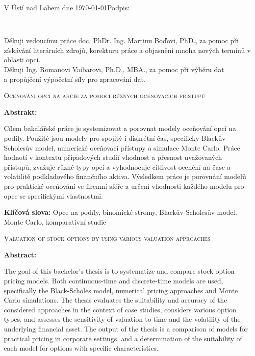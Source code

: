 \documentclass[male,czech,api_bc]{kitheses}
\newcommand{\nazevcz}{Oceňování opcí na akcie za pomocí různých oceňovacích přístupů}        %
\newcommand{\nazeven}{Valuation of stock options by using various valuation approaches}     %
\newcommand{\vedouciDAT}{doc. PhDr. Ing. Martinu Boďovi, PhD.}
\begin{document}
\vspace{2em}

V Ústí nad Labem dne \today   \hfill Podpis: \makebox[4cm][s]{\dotfill}

\cleardoublepage
\thispagestyle{empty}
~
\vfill

\begin{flushright}
    Děkuji vedoucímu práce \vedouciDAT, za pomoc při získávání literárních zdrojů, korekturu práce a objasnění mnoha nových termínů v oblasti opcí. \\
    Děkuji Ing. Romanovi Vaibarovi, Ph.D., MBA., za pomoc při výběru dat \\ a propůjčení výpočetní síly pro zpracování dat.
\end{flushright}

\cleardoublepage

\textsc{\nazevcz}

\textbf{Abstrakt:}

Cílem bakalářské práce je systemizovat a porovnat modely oceňování opcí na podíly. Použité jsou modely pro spojitý i diskrétní čas, specificky Blackův-Scholesův model, numerické oceňovací přístupy a simulace Monte Carlo. Práce hodnotí v kontextu případových studií vhodnost a přesnost uvažovaných přístupů, zvažuje různé typy opcí a vyhodnocuje citlivost ocenění na čase a volatilitě podkladového finančního aktiva. Výsledkem práce je porovnání modelů pro praktické oceňování ve firemní sféře a určení vhodnosti každého modelu pro opce se specifickými vlastnostmi.

\textbf{Klíčová slova:} Opce na podíly, binomické stromy, Blackův-Scholesův model, Monte Carlo, komparativní studie

\bigskip


\textsc{\nazeven}

\textbf{Abstract:}

The goal of this bachelor's thesis is to systematize and compare stock option pricing models. Both continuous-time and discrete-time models are used, specifically the Black-Scholes model, numerical pricing approaches and Monte Carlo simulations. The thesis evaluates the suitability and accuracy of the considered approaches in the context of case studies, considers various option types, and assesses the sensitivity of valuation to time and the volatility of the underlying financial asset. The output of the thesis is a comparison of models for practical pricing in corporate settings, and a determination of the suitability of each model for options with specific characteristics.
\end{document}
